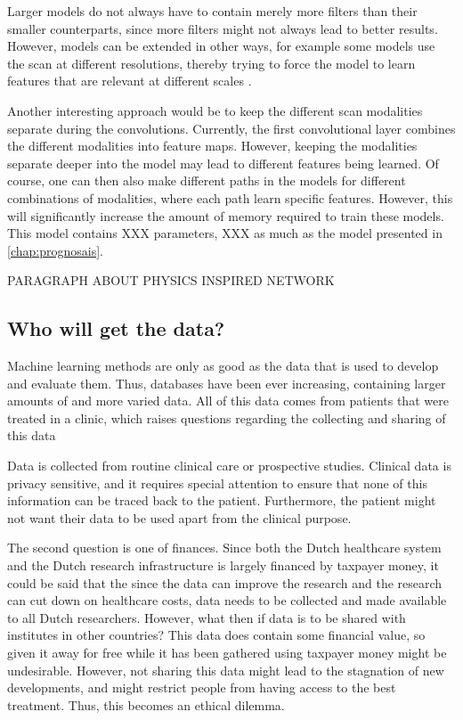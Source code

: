 Larger models do not always have to contain merely more filters than their smaller counterparts, since more filters might not always lead to better results.
However, models can be extended in other ways, for example some models use the scan at different resolutions, thereby trying to force the model to learn features that are relevant at different scales \autocite{akkus20171p19q}.

Another interesting approach would be to keep the different scan modalities separate during the convolutions.
Currently, the first convolutional layer combines the different modalities into feature maps.
However, keeping the modalities separate deeper into the model may lead to different features being learned.
Of course, one can then also make different paths in the models for different combinations of modalities, where each path learn specific features.
However, this will significantly increase the amount of memory required to train these models.
This model contains XXX parameters, XXX as much as the model presented in \cref{chap:prognosais}.

PARAGRAPH ABOUT PHYSICS INSPIRED NETWORK


\subsection{Who will get the data?}

Machine learning methods are only as good as the data that is used to develop and evaluate them.
Thus, databases have been ever increasing, containing larger amounts of and more varied data.
All of this data comes from patients that were treated in a clinic, which raises questions regarding the collecting and sharing of this data

Data is collected from routine clinical care or prospective studies.
Clinical data is privacy sensitive, and it requires special attention to ensure that none of this information can be traced back to the patient.
Furthermore, the patient might not want their data to be used apart from the clinical purpose.

The second question is one of finances.
Since both the Dutch healthcare system and the Dutch research infrastructure is largely financed by taxpayer money, it could be said that the since the data can improve the research and the research can cut down on healthcare costs, data needs to be collected and made available to all Dutch researchers.
However, what then if data is to be shared with institutes in other countries?
This data does contain some financial value, so given it away for free while it has been gathered using taxpayer money might be undesirable.
However, not sharing this data might lead to the stagnation of new developments, and might restrict people from having access to the best treatment.
Thus, this becomes an ethical dilemma.

